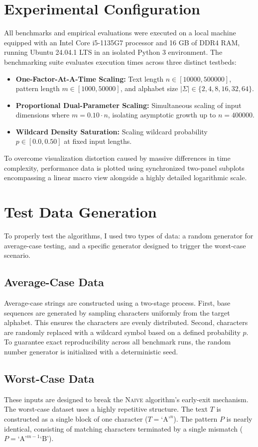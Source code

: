 \section{Experimental Configuration}
All benchmarks and empirical evaluations were executed on a local machine equipped with an Intel Core i5-1135G7 processor and 16 GB of DDR4 RAM, running Ubuntu 24.04.1 LTS in an isolated Python 3 environment. The benchmarking suite evaluates execution times across three distinct testbeds:
\begin{itemize}
    \item \textbf{One-Factor-At-A-Time Scaling:} Text length $n \in [10000, 500000]$, pattern length $m \in [1000, 50000]$, and alphabet size $|\Sigma| \in \{2, 4, 8, 16, 32, 64\}$.
    \item \textbf{Proportional Dual-Parameter Scaling:} Simultaneous scaling of input dimensions where $m = 0.10 \cdot n$, isolating asymptotic growth up to $n = 400000$.
    \item \textbf{Wildcard Density Saturation:} Scaling wildcard probability $p \in [0.0, 0.50]$ at fixed input lengths.
\end{itemize}

To overcome visualization distortion caused by massive differences in time complexity, performance data is plotted using synchronized two-panel subplots encompassing a linear macro view alongside a highly detailed logarithmic scale.

\section{Test Data Generation}
To properly test the algorithms, I used two types of data: a random generator for average-case testing, and a specific generator designed to trigger the worst-case scenario.

\subsection{Average-Case Data}
Average-case strings are constructed using a two-stage process. First, base sequences are generated by sampling characters uniformly from the target alphabet. This ensures the characters are evenly distributed. Second, characters are randomly replaced with a wildcard symbol based on a defined probability $p$. To guarantee exact reproducibility across all benchmark runs, the random number generator is initialized with a deterministic seed.

\subsection{Worst-Case Data}
These inputs are designed to break the \textsc{Naive} algorithm's early-exit mechanism. The worst-case dataset uses a highly repetitive structure. The text $T$ is constructed as a single block of one character ($T = \text{`A'}^n$). The pattern $P$ is nearly identical, consisting of matching characters terminated by a single mismatch ($P = \text{`A'}^{m-1} \text{`B'}$). 

